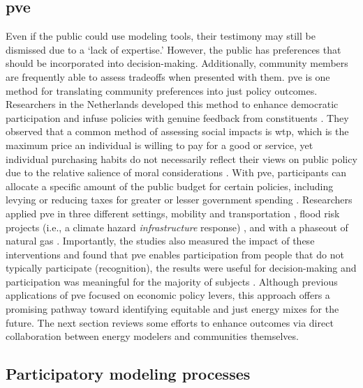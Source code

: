 \subsection{\Acl{pve}}

Even if the public could use modeling tools, their testimony may still be
dismissed due to a `lack of expertise.' However, the public has preferences that
should be incorporated into decision-making. Additionally, community members are
frequently able to assess tradeoffs when presented with them. \Acf{pve} is one
method for translating community preferences into just policy outcomes.
Researchers in the Netherlands developed this method to enhance democratic
participation and infuse policies with genuine feedback from constituents
\cite{mouter_introduction_2019}. They observed that a common method of assessing
social impacts is \ac{wtp}, which is the maximum price an individual is willing
to pay for a good or service, yet individual purchasing habits do not
necessarily reflect their views on public policy due to the relative salience of
moral considerations \cite{mouter_introduction_2019}. With \ac{pve},
participants can allocate a specific amount of the public budget for certain
policies, including levying or reducing taxes for greater or lesser government
spending \cite{mouter_introduction_2019}. Researchers applied \ac{pve} in three
different settings, mobility and transportation \cite{mouter_contrasting_2021},
flood risk projects (i.e., a climate hazard \textit{infrastructure} response)
\cite{dekker_economics_2019}, and with a phaseout of natural gas
\cite{mouter_including_2021}. Importantly, the studies also measured the impact
of these interventions and found that \ac{pve} enables participation from people
that do not typically participate (recognition), the results were useful for
decision-making and participation was meaningful for the majority of subjects
\cite{mouter_including_2021}. Although previous applications of \ac{pve} focused
on economic policy levers, this approach offers a promising pathway toward
identifying equitable and just energy mixes for the future. The next section
reviews some efforts to enhance outcomes via direct collaboration between energy
modelers and communities themselves.

\subsection{Participatory modeling processes}

